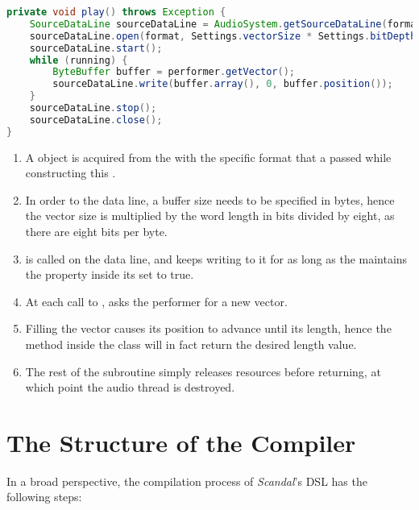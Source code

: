 \begin{lstlisting}[language=Java,caption={Writing buffers of audio data inside the \il{play} subroutine.},label={alg:play}]
private void play() throws Exception {
	SourceDataLine sourceDataLine = AudioSystem.getSourceDataLine(format);
	sourceDataLine.open(format, Settings.vectorSize * Settings.bitDepth / 8);
	sourceDataLine.start();
	while (running) {
		ByteBuffer buffer = performer.getVector();
		sourceDataLine.write(buffer.array(), 0, buffer.position());
	}
	sourceDataLine.stop();
	sourceDataLine.close();
}
\end{lstlisting}

\begin{enumerate}
	\addtocounter{enumi}{1}
	\item A  object is acquired from the  with the specific format that a  passed while constructing this .
	\item In order to  the data line, a buffer size needs to be specified in bytes, hence the vector size is multiplied by the word length in bits divided by eight, as there are eight bits per byte.
	\item {} is called on the data line, and  keeps writing to it for as long as the  maintains the  property inside its  set to true.
	\addtocounter{enumi}{1}
	\item At each call to ,  asks the performer for a new vector.
	\item Filling the vector causes its position to advance until its length, hence the  method inside the  class will in fact return the desired length value.
	\addtocounter{enumi}{1}
	\item The rest of the  subroutine simply releases resources before returning, at which point the audio thread is destroyed.
\end{enumerate}

\section{The Structure of the Compiler}

In a broad perspective, the compilation process of \emph{Scandal}'s DSL has the following steps:

